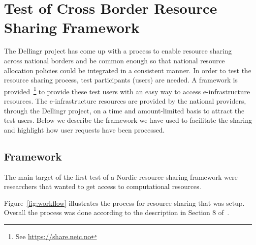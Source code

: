 \documentclass{article}
\newcommand{\dell}{Dellingr\xspace}
\newcommand{\einfra}{e-infrastructure\xspace}
\newcommand{\np}{national provider\xspace}
\newcommand{\nps}{\np{s}\xspace}
\newcommand{\pilot}{first test of a Nordic resource-sharing framework\xspace}
\begin{document}
\section{Test of Cross Border Resource Sharing Framework}

The \dell project has come up with a process to enable resource sharing across national borders and be common enough so that national resource allocation policies could be integrated in a consistent manner.
In order to test the resource sharing process, test participants (users) are needed.
A framework is provided~\footnote{See \url{https://share.neic.no}} to provide these test users with an easy way to access \einfra resources.
The \einfra resources are provided by the \nps, through the \dell project, on a time and amount-limited basis to attract the test users.
Below we describe the framework we have used to facilitate the sharing and highlight how user requests have been processed.

\subsection{Framework}
\label{ssec:framework}

The main target of the \pilot were researchers that wanted to get access to computational resources.

Figure~\ref{fig:workflow} illustrates the process for resource sharing that was setup.
Overall the process was done according to the description in Section 8 of~\cite{dellingr-p2-do5}.
\end{document}
